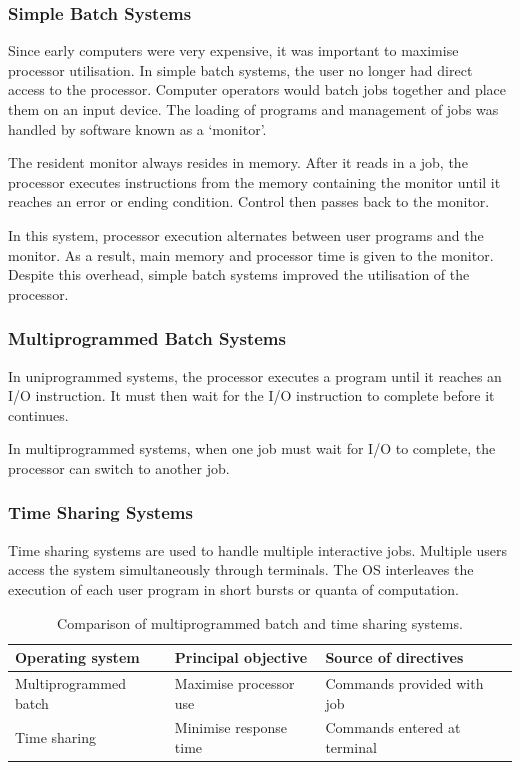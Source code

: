 \subsubsection{Simple Batch Systems}

Since early computers were very expensive, it was important to maximise processor utilisation.
In simple batch systems, the user no longer had direct access to the processor.
Computer operators would batch jobs together and place them on an input device.
The loading of programs and management of jobs was handled by software known as a `monitor'.

The resident monitor always resides in memory.
After it reads in a job, the processor executes instructions from the memory containing the monitor until it reaches an error or ending condition.
Control then passes back to the monitor.

In this system, processor execution alternates between user programs and the monitor.
As a result, main memory and processor time is given to the monitor.
Despite this overhead, simple batch systems improved the utilisation of the processor.

\subsubsection{Multiprogrammed Batch Systems}

In uniprogrammed systems, the processor executes a program until it reaches an I/O instruction.
It must then wait for the I/O instruction to complete before it continues.

In multiprogrammed systems, when one job must wait for I/O to complete, the processor can switch to another job.

\subsubsection{Time Sharing Systems}

Time sharing systems are used to handle multiple interactive jobs.
Multiple users access the system simultaneously through terminals.
The OS interleaves the execution of each user program in short bursts or quanta of computation.

\begin{table}[htp]
  \centering
  \caption*{Comparison of multiprogrammed batch and time sharing systems.}
  \begin{tabular}{lll}
    \toprule
    Operating system & Principal objective & Source of directives \\
    \midrule
    Multiprogrammed batch & Maximise processor use & Commands provided with job \\
    Time sharing & Minimise response time & Commands entered at terminal \\
    \bottomrule
  \end{tabular}
\end{table}

